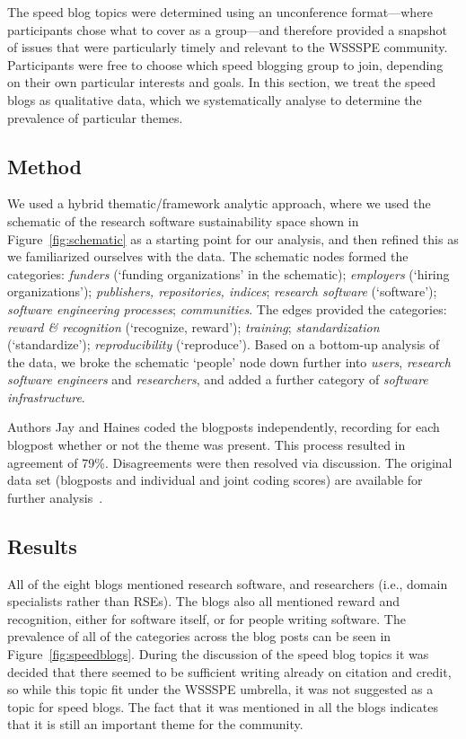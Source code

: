 \documentclass[11pt,letterpaper]{article}
\newcommand{\note}[1]{ {\textcolor{blueish}        { ***Note: #1 }}}
\begin{document}


The speed blog topics were determined using an unconference format---where participants chose what to cover as a group---and therefore provided a snapshot of issues that were particularly timely and relevant to the WSSSPE community. Participants were free to choose which speed blogging group to join, depending on their own particular interests and goals. In this section, we treat the speed blogs as qualitative data, which we systematically analyse to determine the prevalence of particular themes.

\subsection{Method} 
We used a hybrid thematic/framework analytic approach, where we used the schematic of the research software sustainability space shown in Figure~\ref{fig:schematic} as a starting point for our analysis, and then refined this as we familiarized ourselves with the data. The schematic nodes formed the categories: \emph{funders} (`funding organizations' in the schematic); \emph{employers} (`hiring organizations'); \emph{publishers, repositories, indices}; \emph{research software} (`software'); \emph{software engineering processes}; \emph{communities}. The edges provided the categories: \emph{reward \& recognition} (`recognize, reward'); \emph{training}; \emph{standardization} (`standardize'); \emph{reproducibility} (`reproduce'). Based on a bottom-up analysis of the data, we broke the schematic `people' node down further into \emph{users}, \emph{research software engineers} and \emph{researchers}, and added a further category of \emph{software infrastructure}.

Authors Jay and Haines coded the blogposts independently, recording for each blogpost whether or not the theme was present. This process resulted in agreement of 79\%. Disagreements were then resolved via discussion. The original data set (blogposts and individual and joint coding scores) are available for further analysis~\cite{data:speed-blog-analysis}.

\subsection{Results}
All of the eight blogs mentioned research software, and researchers (i.e., domain specialists rather than RSEs). The blogs also all mentioned reward and recognition, either for software itself, or for people writing software. The prevalence of all of the categories across the blog posts can be seen in Figure~\ref{fig:speedblogs}. During the discussion of the speed blog topics it was decided that there seemed to be sufficient writing already on citation and credit, so while this topic fit under the WSSSPE umbrella, it was not suggested as a topic for speed blogs. The fact that it was mentioned in all the blogs indicates that it is still an important theme for the community.
\end{document}
